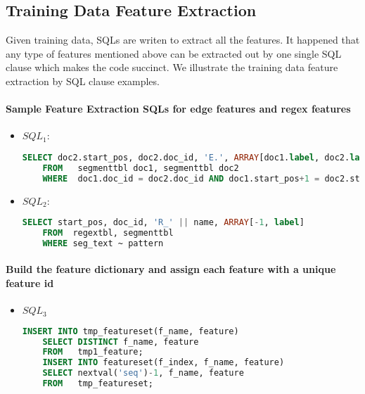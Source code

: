 \subsection{Training Data Feature Extraction}
Given training data, SQLs are writen to extract all the features. It happened that any type of features mentioned above can be extracted out by one single SQL clause which makes the code succinct. We illustrate the training data feature extraction by SQL clause examples.

\paragraph{Sample Feature Extraction SQLs for edge features and regex features}
\begin{itemize}
\item $SQL_1$:\\
\begin{lstlisting}[language=SQL,gobble=4]
    SELECT doc2.start_pos, doc2.doc_id, 'E.', ARRAY[doc1.label, doc2.label]
    FROM   segmenttbl doc1, segmenttbl doc2
    WHERE  doc1.doc_id = doc2.doc_id AND doc1.start_pos+1 = doc2.start_pos
\end{lstlisting}

\item $SQL_2$:\\
\begin{lstlisting}[language=SQL,gobble=4]
    SELECT start_pos, doc_id, 'R_' || name, ARRAY[-1, label]
    FROM  regextbl, segmenttbl
    WHERE seg_text ~ pattern
\end{lstlisting}
\end{itemize}

\paragraph{Build the feature dictionary and assign each feature with a unique feature id}
\begin{itemize}
\item $SQL_3$\\ 
\begin{lstlisting}[language=SQL,gobble=4]
    INSERT INTO tmp_featureset(f_name, feature) 
    SELECT DISTINCT f_name, feature
    FROM   tmp1_feature;
    INSERT INTO featureset(f_index, f_name, feature) 
    SELECT nextval('seq')-1, f_name, feature
    FROM   tmp_featureset;
\end{lstlisting}
\end{itemize}

